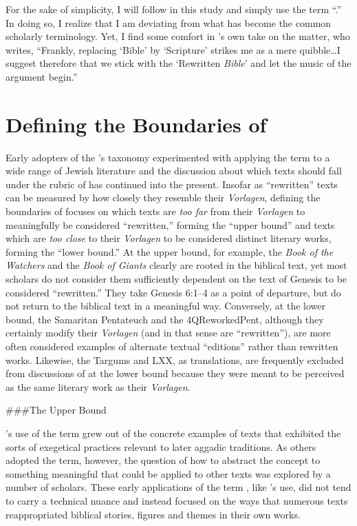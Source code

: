 For the sake of simplicity, I will follow \vermes in
this study and simply use the term ``\RwB.'' In doing
so, I realize that I am deviating from what has become the common
scholarly terminology. Yet, I find some comfort in
\vermes's own take on the matter, who writes, ``Frankly,
replacing `Bible' by `Scripture' strikes me as a mere quibble\ldots{}I
suggest therefore that we stick with the `Rewritten \emph{Bible}' and
let the music of the argument begin.''\autocite[original
emphasis]{vermes_zsengeller2014}

\hypertarget{defining-the-boundaries-of-rwb}{%
\section{Defining the Boundaries of
\RWB}\label{defining-the-boundaries-of-rwb}}

Early adopters of the \vermes's taxonomy experimented
with applying the term \rwb to a wide range of
\secondtemple Jewish literature and the discussion about which
texts should fall under the rubric of \rwb has continued
into the present. Insofar as ``rewritten'' texts can be measured by how
closely they resemble their \emph{Vorlagen}, defining the boundaries of
\rwb focuses on which texts are \emph{too far} from
their \emph{Vorlagen} to meaningfully be considered ``rewritten,''
forming the ``upper bound'' and texts which are \emph{too close} to
their \emph{Vorlagen} to be considered distinct literary works, forming
the ``lower bound.'' At the upper bound, for example, the \emph{Book of
the Watchers} and the \emph{Book of Giants} clearly are rooted in the
biblical text, yet most scholars do not consider them sufficiently
dependent on the text of Genesis to be considered ``rewritten.'' They
take Genesis 6:1--4 as a point of departure, but do not return to the
biblical text in a meaningful way. Conversely, at the lower bound, the
Samaritan Pentateuch and the 4QReworkedPent, although they certainly
modify their \emph{Vorlagen} (and in that sense are ``rewritten''), are
more often considered examples of alternate textual ``editions'' rather
than rewritten works. Likewise, the Targums and LXX, as translations,
are frequently excluded from discussions of \rwb at the
lower bound because they were meant to be perceived as the same literary
work as their \emph{Vorlagen}.

\#\#\#The Upper Bound

\vermes's use of the term \rwb grew out
of the concrete examples of texts that exhibited the sorts of exegetical
practices relevant to later aggadic traditions. As others adopted the
term, however, the question of how to abstract the concept to something
meaningful that could be applied to other texts was explored by a number
of scholars. These early applications of the term \rwb,
like \vermes's use, did not tend to carry a technical
nuance and instead focused on the ways that numerous texts
reappropriated biblical stories, figures and themes in their own works.

